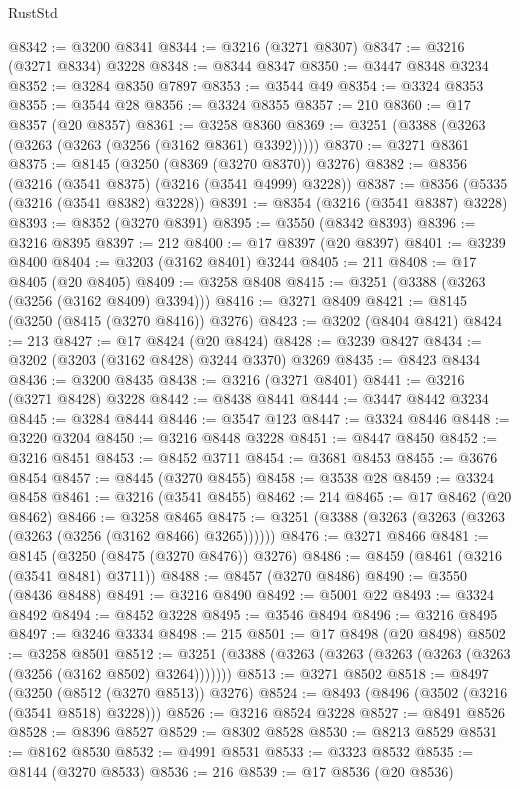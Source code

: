 \begin{lexlean}{RustStd}
\begin{coremodule}
@8342 := @3200 @8341
@8344 := @3216 (@3271 @8307)
@8347 := @3216 (@3271 @8334) @3228
@8348 := @8344 @8347
@8350 := @3447 @8348 @3234
@8352 := @3284 @8350 @7897
@8353 := @3544 @49
@8354 := @3324 @8353
@8355 := @3544 @28
@8356 := @3324 @8355
@8357 := 210
@8360 := @17 @8357 (@20 @8357)
@8361 := @3258 @8360
@8369 := @3251 (@3388 (@3263 (@3263 (@3263 (@3256 (@3162 @8361) @3392)))))
@8370 := @3271 @8361
@8375 := @8145 (@3250 (@8369 (@3270 @8370)) @3276)
@8382 := @8356 (@3216 (@3541 @8375) (@3216 (@3541 @4999) @3228))
@8387 := @8356 (@5335 (@3216 (@3541 @8382) @3228))
@8391 := @8354 (@3216 (@3541 @8387) @3228)
@8393 := @8352 (@3270 @8391)
@8395 := @3550 (@8342 @8393)
@8396 := @3216 @8395
@8397 := 212
@8400 := @17 @8397 (@20 @8397)
@8401 := @3239 @8400
@8404 := @3203 (@3162 @8401) @3244
@8405 := 211
@8408 := @17 @8405 (@20 @8405)
@8409 := @3258 @8408
@8415 := @3251 (@3388 (@3263 (@3256 (@3162 @8409) @3394)))
@8416 := @3271 @8409
@8421 := @8145 (@3250 (@8415 (@3270 @8416)) @3276)
@8423 := @3202 (@8404 @8421)
@8424 := 213
@8427 := @17 @8424 (@20 @8424)
@8428 := @3239 @8427
@8434 := @3202 (@3203 (@3162 @8428) @3244 @3370) @3269
@8435 := @8423 @8434
@8436 := @3200 @8435
@8438 := @3216 (@3271 @8401)
@8441 := @3216 (@3271 @8428) @3228
@8442 := @8438 @8441
@8444 := @3447 @8442 @3234
@8445 := @3284 @8444
@8446 := @3547 @123
@8447 := @3324 @8446
@8448 := @3220 @3204
@8450 := @3216 @8448 @3228
@8451 := @8447 @8450
@8452 := @3216 @8451
@8453 := @8452 @3711
@8454 := @3681 @8453
@8455 := @3676 @8454
@8457 := @8445 (@3270 @8455)
@8458 := @3538 @28
@8459 := @3324 @8458
@8461 := @3216 (@3541 @8455)
@8462 := 214
@8465 := @17 @8462 (@20 @8462)
@8466 := @3258 @8465
@8475 := @3251 (@3388 (@3263 (@3263 (@3263 (@3263 (@3256 (@3162 @8466) @3265))))))
@8476 := @3271 @8466
@8481 := @8145 (@3250 (@8475 (@3270 @8476)) @3276)
@8486 := @8459 (@8461 (@3216 (@3541 @8481) @3711))
@8488 := @8457 (@3270 @8486)
@8490 := @3550 (@8436 @8488)
@8491 := @3216 @8490
@8492 := @5001 @22
@8493 := @3324 @8492
@8494 := @8452 @3228
@8495 := @3546 @8494
@8496 := @3216 @8495
@8497 := @3246 @3334
@8498 := 215
@8501 := @17 @8498 (@20 @8498)
@8502 := @3258 @8501
@8512 := @3251 (@3388 (@3263 (@3263 (@3263 (@3263 (@3263 (@3256 (@3162 @8502) @3264)))))))
@8513 := @3271 @8502
@8518 := @8497 (@3250 (@8512 (@3270 @8513)) @3276)
@8524 := @8493 (@8496 (@3502 (@3216 (@3541 @8518) @3228)))
@8526 := @3216 @8524 @3228
@8527 := @8491 @8526
@8528 := @8396 @8527
@8529 := @8302 @8528
@8530 := @8213 @8529
@8531 := @8162 @8530
@8532 := @4991 @8531
@8533 := @3323 @8532
@8535 := @8144 (@3270 @8533)
@8536 := 216
@8539 := @17 @8536 (@20 @8536)

\end{coremodule}
\end{lexlean}
